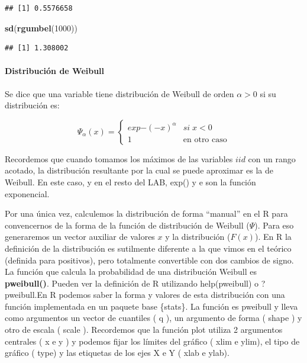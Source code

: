 \documentclass[
  oneside]{article}
\newenvironment{Shaded}{\begin{snugshade}}{\end{snugshade}}
\newcommand{\DecValTok}[1]{\textcolor[rgb]{0.00,0.00,0.81}{#1}}
\newcommand{\FunctionTok}[1]{\textcolor[rgb]{0.13,0.29,0.53}{\textbf{#1}}}
\newcommand{\NormalTok}[1]{#1}
\begin{document}
\begin{verbatim}
## [1] 0.5576658
\end{verbatim}

\begin{Shaded}
\begin{Highlighting}[]
\FunctionTok{sd}\NormalTok{(}\FunctionTok{rgumbel}\NormalTok{(}\DecValTok{1000}\NormalTok{))}
\end{Highlighting}
\end{Shaded}

\begin{verbatim}
## [1] 1.308002
\end{verbatim}

\hypertarget{distribuciuxf3n-de-weibull}{%
\paragraph{Distribución de Weibull}\label{distribuciuxf3n-de-weibull}}

Se dice que una variable tiene distribución de Weibull de orden
\(\alpha>0\) si su distribución es:

\begin{equation}
\Psi_{\alpha}(x)=\begin{cases}
exp{-(-x)^{\alpha}} & si\;x<0\\
1 & \text{en otro caso}
\end{cases}
\end{equation}

Recordemos que cuando tomamos los máximos de las variables \(iid\) con
un rango acotado, la distribución resultante por la cual se puede
aproximar es la de Weibull. En este caso, y en el resto del LAB, exp() y
e son la función exponencial.

Por una única vez, calculemos la distribución de forma ``manual'' en el
R para convencernos de la forma de la función de distribución de Weibull
(\(\Psi\)). Para eso generaremos un vector auxiliar de valores \(x\) y
la distribución (\(F(x)\)). En R la definición de la distribución es
sutilmente diferente a la que vimos en el teórico (definida para
positivos), pero totalmente convertible con dos cambios de signo. La
función que calcula la probabilidad de una distribución Weibull es
\textbf{pweibull()}. Pueden ver la definición de R utilizando
help(pweibull) o ?pweibull.En R podemos saber la forma y valores de esta
distribución con una función implementada en un paquete base \{stats\}.
La función es pweibull y lleva como argumentos un vector de cuantiles (
q ), un argumento de forma ( shape ) y otro de escala ( scale ).
Recordemos que la función plot utiliza 2 argumentos centrales ( x e y )
y podemos fijar los límites del gráfico ( xlim e ylim), el tipo de
gráfico ( type) y las etiquetas de los ejes X e Y ( xlab e ylab).
\end{document}
